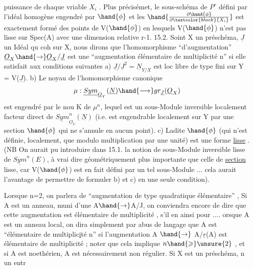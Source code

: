 
puissance de chaque vriable $X_i$ . Plus précisémet, le sous-schéma
de $P^r$ défini par l'idéal homogène engendré par  $\hand{\phi}$ et les $\hand{\frac{\partial\hand{\phi}}{\partial\textcolor{black}{X_i}}}$ est
exactement formé des points de V($\hand{\phi}$) en lesquels V($\hand{\phi}$) n'est pas lisse sur
Spec(A) avec une dimension relative r-1.
15.2. Soint X un préschéma, $\underline{J}$ un Idéal qu coh  sur X, nous dirons que
l'homomorphisme ``d'augmentation'' $\underline{O}_X \hand{\to} \underline{O}_X/\underline{J}$ est une ``augmentation
élémentaire de multiplicité n'' si elle satisfait aux conditions suivantes
a) $\underline{J}/\underline{J}^2 = \underline{N}_{Y/X}$ est loc libre de type fini sur Y = V($\underline{J}$).
b) Le noyau de l'homomorphisme canonique
\[ \mu : \underline{Sym}_{\underline{O}_Y}(\underline{N}) \hand{\longrightarrow} gr_{\underline{J}}(\underline{O}_X) \]
est engendré par le nou K de $\mu^n$, lequel est un sous-Module inversible
localement facteur direct de $\underline{Sym}^n_{\underline{O}_Y}(\underline{N})$ (i.e. est engendrable localement
sur Y par une section $\hand{\phi}$ qui ne s'annule en aucun point).
c) Ladite $\hand{\phi}$ (qui n'est définie, localement, que modulo multiplication
par une unité) est une forme \uline{lisse} . (NB On aurait pu introduire dans
\placedmargin{\textbar}15.1. la notion de sous-Module inversible lisse de $\underline{Sym}^n(E)$, à vrai dire
géométriquement plus importante que celle de \uline{section} lisse, car V($\hand{\phi}$) est
en fait défini par un tel sous-Module ... cela aurait l'avantage de
permettre de formuler b) et c) en une seule condition).

Lorsque n=2, on parlera de ``augmentation de type quadratique élémentaire'' ,
Si A est un anneau,  muni d'une  A$\hand{\to}$A/J,
on conviendra encore de dire que cette augmentation est élémentaire de
multiplicité  , s'il en  ainsi pour .... orsque A est un anneau
local, on dira simplement par abus de langage que A est ``élémentaire de
multiplic\uline{i}té n'' si l'augmentation A $\hand{\to}$ A/$\underline{r}$(A) est élémentaire de
multiplicité ; noter que cela implique $n \hand{\geqslant} \unsure{2}$ , et si A est noethérien,
A est nécessairement non régulier. Si X est un préschéma, n un entr

